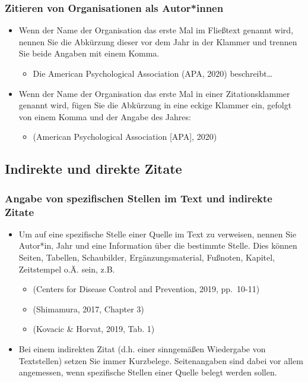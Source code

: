 \documentclass[
  letterpaper,
  DIV=11]{scrreprt}
\providecommand{\tightlist}{%
  \setlength{\itemsep}{0pt}\setlength{\parskip}{0pt}}\usepackage{longtable,booktabs,array}
\begin{document}
\subsubsection{Zitieren von Organisationen als
Autor*innen}\label{zitieren-von-organisationen-als-autorinnen}

\begin{itemize}
\item
  Wenn der Name der Organisation das erste Mal im Fließtext genannt
  wird, nennen Sie die Abkürzung dieser vor dem Jahr in der Klammer und
  trennen Sie beide Angaben mit einem Komma.

  \begin{itemize}
  \tightlist
  \item
    Die American Psychological Association (APA, 2020)
    beschreibt\ldots{}
  \end{itemize}
\item
  Wenn der Name der Organisation das erste Mal in einer Zitationsklammer
  genannt wird, fügen Sie die Abkürzung in eine eckige Klammer ein,
  gefolgt von einem Komma und der Angabe des Jahres:

  \begin{itemize}
  \tightlist
  \item
    (American Psychological Association {[}APA{]}, 2020)
  \end{itemize}
\end{itemize}

\subsection{Indirekte und direkte Zitate}\label{sec-indirect}

\subsubsection{Angabe von spezifischen Stellen im Text und indirekte
Zitate}\label{angabe-von-spezifischen-stellen-im-text-und-indirekte-zitate}

\begin{itemize}
\item
  Um auf eine spezifische Stelle einer Quelle im Text zu verweisen,
  nennen Sie Autor*in, Jahr und eine Information über die bestimmte
  Stelle. Dies können Seiten, Tabellen, Schaubilder, Ergänzungsmaterial,
  Fußnoten, Kapitel, Zeitstempel o.Ä. sein, z.B.

  \begin{itemize}
  \item
    (Centers for Disease Control and Prevention, 2019, pp.~10-11)
  \item
    (Shimamura, 2017, Chapter 3)
  \item
    (Kovacic \& Horvat, 2019, Tab. 1)
  \end{itemize}
\item
  Bei einem indirekten Zitat (d.h. einer sinngemäßen Wiedergabe von
  Textstellen) setzen Sie immer Kurzbelege. Seitenangaben sind dabei vor
  allem angemessen, wenn spezifische Stellen einer Quelle belegt werden
  sollen.
\end{itemize}
\end{document}
